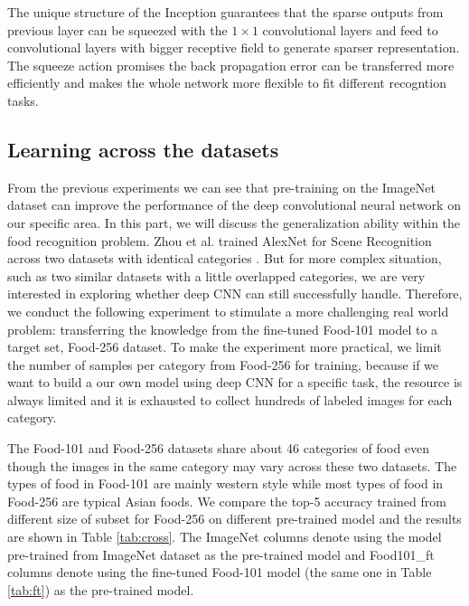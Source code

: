 The unique structure of the Inception guarantees that the sparse outputs from previous layer can be squeezed with the $1\times 1$ convolutional layers and feed to convolutional layers with bigger receptive field to generate sparser representation. The squeeze action promises the back propagation error can be transferred more efficiently and makes the whole network more flexible to fit different recogntion tasks.

\subsection{Learning across the datasets}
From the previous experiments we can see that pre-training on the ImageNet dataset can improve the performance of the deep convolutional neural network on our specific area. In this part, we will discuss the generalization ability within the food recognition problem.  Zhou et al. trained AlexNet for Scene Recognition across two datasets with identical categories \cite{NIPS2014_Zhou}. But for more complex situation, such as two similar datasets with a little overlapped categories, we are very interested in exploring whether deep CNN can still successfully handle. Therefore, we conduct the following experiment to stimulate a more challenging real world problem: transferring the knowledge from the fine-tuned Food-101 model to a target set, Food-256 dataset. To make the experiment more practical, we limit the number of samples per category from Food-256 for training, because if we want to build a our own model using deep CNN for a specific task, the resource is always limited and it is exhausted to collect hundreds of labeled images for each category.

The Food-101 and Food-256 datasets share about 46 categories of food even though the images in the same category may vary across these two datasets. The types of food in Food-101 are mainly western style while most types of food in Food-256 are typical Asian foods. We compare the top-5 accuracy trained from different size of subset for Food-256 on different pre-trained model and the results are shown in Table \ref{tab:cross}.
The ImageNet columns denote using the model pre-trained from ImageNet dataset as the pre-trained model and Food101\_ft columns denote using the fine-tuned Food-101 model (the same one in Table \ref{tab:ft}) as the pre-trained model.

